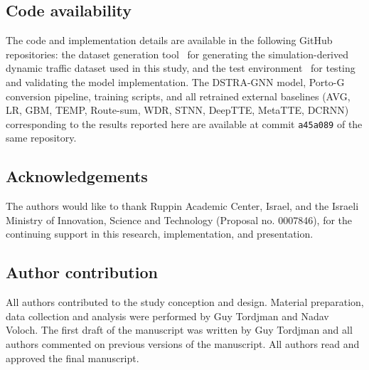 \documentclass[pdflatex,sn-basic,Numbered]{sn-jnl}%
\begin{document}
\subsection*{Code availability}
The code and implementation details are available in the following GitHub repositories: the dataset generation tool~\cite{sumo_data_generator} for generating the simulation-derived dynamic traffic dataset used in this study, and the test environment~\cite{trafficlab} for testing and validating the model implementation. The DSTRA-GNN model, Porto-G conversion pipeline, training scripts, and all retrained external baselines (AVG, LR, GBM, TEMP, Route-sum, WDR, STNN, DeepTTE, MetaTTE, DCRNN) corresponding to the results reported here are available at commit \texttt{a45a089} of the same repository.

\subsection*{Acknowledgements}
The authors would like to thank Ruppin Academic Center, Israel, and the Israeli Ministry of Innovation, Science and Technology (Proposal no. 0007846), for the continuing support in this research, implementation, and presentation.

\subsection*{Author contribution}
All authors contributed to the study conception and design. Material preparation, data collection and analysis were performed by Guy Tordjman and Nadav Voloch. The first draft of the manuscript was written by Guy Tordjman and all authors commented on previous versions of the manuscript. All authors read and approved the final manuscript.




\end{document}
